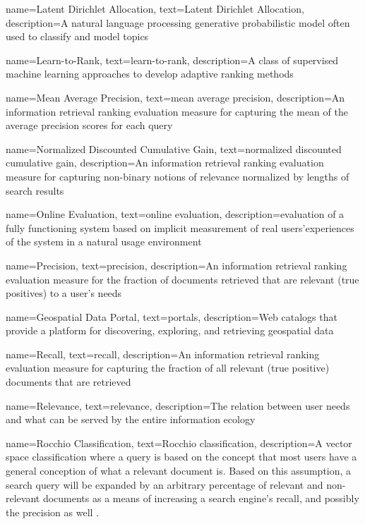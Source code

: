 {
    name=Latent Dirichlet Allocation,
    text=Latent Dirichlet Allocation,
    description=A natural language processing generative probabilistic model often used to classify and model topics
}

{
    name=Learn-to-Rank,
    text=learn-to-rank,
    description=A class of supervised machine learning approaches to develop adaptive ranking methods
}

{
    name=Mean Average Precision,
    text=mean average precision,
    description=An information retrieval ranking evaluation measure for capturing the mean of the average precision scores for each query
}

{
    name=Normalized Discounted Cumulative Gain,
    text=normalized discounted cumulative gain,
    description=An information retrieval ranking evaluation measure for capturing non-binary notions of relevance normalized by lengths of search results
}

{
    name=Online Evaluation,
    text=online evaluation,
    description={evaluation of a fully functioning system based on implicit measurement of real users’experiences of the system in a natural usage environment \cite{Hofmann2016}}
}

{
    name=Precision,
    text=precision,
    description=An information retrieval ranking evaluation measure for the fraction of documents retrieved that are relevant (true positives) to a user's needs
}

{
    name=Geospatial Data Portal,
    text=portals,
    description={Web catalogs that provide a platform for discovering, exploring, and retrieving geospatial data}
}

{
    name=Recall,
    text=recall,
    description=An information retrieval ranking evaluation measure for capturing the fraction of all relevant (true positive) documents that are retrieved
}

{
    name=Relevance,
    text=relevance,
    description=The relation between user needs and what can be served by  the  entire  information  ecology \cite{Hjorland2010}
}

{
    name=Rocchio Classification,
    text=Rocchio classification,
    description={A vector space classification where a query is based on the concept that most users have a general conception of what a relevant document is. Based on this assumption, a search query will be expanded by an arbitrary percentage of relevant and non-relevant documents as a means of increasing a search engine's recall, and possibly the precision as well \cite{Manning2008}}.
}


